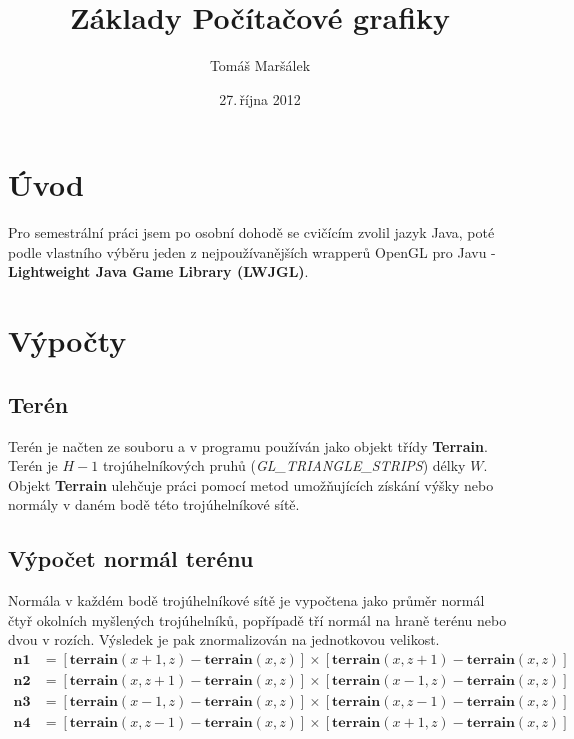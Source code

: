 \documentclass[11pt]{article}
\title{Základy Počítačové grafiky}
\author{Tomáš Maršálek}
\date{27.\,října 2012}
\begin{document}
\maketitle
\section{Úvod}
Pro semestrální práci jsem po osobní dohodě se cvičícím zvolil jazyk Java, poté
podle vlastního výběru jeden z nejpoužívanějších wrapperů OpenGL pro Javu -
\textbf {Lightweight Java Game Library (LWJGL)}.


\section{Výpočty}
\subsection{Terén}
Terén je načten ze souboru a v programu používán jako objekt třídy
\textbf{Terrain}. Terén je $H - 1$ trojúhelníkových pruhů
(\textit{GL\_TRIANGLE\_STRIPS}) délky $W$. Objekt \textbf{Terrain} ulehčuje
práci pomocí metod umožňujících získání výšky nebo normály v daném bodě
této trojúhelníkové sítě.

\subsection{Výpočet normál terénu}
Normála v každém bodě trojúhelníkové sítě je vypočtena jako průměr normál čtyř
okolních myšlených trojúhelníků, popřípadě tří normál na hraně terénu nebo dvou
v rozích. Výsledek je pak znormalizován na jednotkovou velikost. \\

\begin{align*}
\mathbf {n1} &= \left[ \mathbf {terrain}(x + 1, z) - \mathbf {terrain}(x, z)
\right] \times \left[ \mathbf {terrain}(x, z + 1) - \mathbf {terrain}(x, z)
\right] \\
%
\mathbf {n2} &= \left[ \mathbf {terrain}(x, z + 1) - \mathbf {terrain}(x, z)
\right] \times \left[ \mathbf {terrain}(x - 1, z) - \mathbf {terrain}(x, z)
\right] \\
%
\mathbf {n3} &= \left[ \mathbf {terrain}(x - 1, z) - \mathbf {terrain}(x, z)
\right] \times \left[ \mathbf {terrain}(x, z - 1) - \mathbf {terrain}(x, z)
\right] \\
%
\mathbf {n4} &= \left[ \mathbf {terrain}(x, z - 1) - \mathbf {terrain}(x, z)
\right] \times \left[ \mathbf {terrain}(x + 1, z) - \mathbf {terrain}(x, z)
\right] \\
\end{align*}
\end{document}
